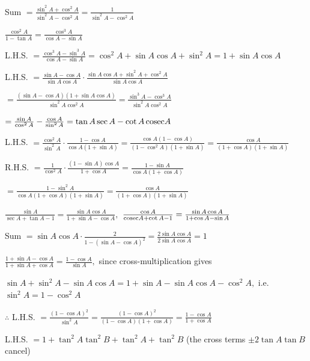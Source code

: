     Sum $= \frac{\sin^2 A + \cos^2 A}{\sin^2 A - \cos^2 A} = \frac{1}{\sin^2 A - \cos^2 A}$

\item $\frac{\cos^2 A}{1 - \tan A} = \frac{\cos^3 A}{\cos A - \sin A}$

    L.H.S. $= \frac{\cos^3 A - \sin^3 A}{\cos A - \sin A} = \cos^2 A + \sin A\cos A + \sin^2 A = 1 + \sin A\cos A$

\item L.H.S. $= \frac{\sin A - \cos A}{\sin A\cos A}\cdot\frac{\sin A\cos A + \sin^2 A + \cos^2 A}{\sin A\cos A}$

    $= \frac{(\sin A - \cos A)(1 + \sin A\cos A)}{\sin^2 A\cos^2 A} = \frac{\sin^3 A - \cos^3 A}{\sin^2 A\cos^2 A}$

    $= \frac{\sin A}{\cos^2 A} - \frac{\cos A}{\sin^2 A} = \tan A\sec A - \cot A\,{\rm cosec} A$

\item L.H.S. $= \frac{\cos^2 A}{\sin^2 A}\cdot\frac{1 - \cos A}{\cos A(1 + \sin A)} = \frac{\cos A(1 - \cos A)}{(1 - \cos^2 A)(1
    + \sin A)} = \frac{\cos A}{(1 + \cos A)(1 + \sin A)}$

    R.H.S. $= \frac{1}{\cos^2 A}\cdot\frac{(1 - \sin A)\cos A}{1 + \cos A} = \frac{1 - \sin A}{\cos A(1 + \cos A)}$

    $= \frac{1 - \sin^2 A}{\cos A(1 + \cos A)(1 + \sin A)} = \frac{\cos A}{(1 + \cos A)(1 + \sin A)}$

\item $\frac{\sin A}{\sec A + \tan A - 1} = \frac{\sin A\cos A}{1 + \sin A - \cos A},$ $\frac{\cos A}{{\rm cosec} A + \cot A - 1} =
    \frac{\sin A\cos A}{1 + \cos A - \sin A}$

    Sum $= \sin A\cos A\cdot\frac{2}{1 - (\sin A - \cos A)^2} = \frac{2\sin A\cos A}{2\sin A\cos A} = 1$

\item $\frac{1 + \sin A - \cos A}{1 + \sin A + \cos A} = \frac{1 - \cos A}{\sin A},$ since cross-multiplication gives

    $\sin A + \sin^2 A - \sin A\cos A = 1 + \sin A - \sin A\cos A - \cos^2 A,$ i.e. $\sin^2 A = 1 - \cos^2 A$

    $\therefore$ L.H.S. $= \frac{(1 - \cos A)^2}{\sin^2 A} = \frac{(1 - \cos A)^2}{(1 - \cos A)(1 + \cos A)} = \frac{1 - \cos A}{1 +
    \cos A}$

\item L.H.S. $= 1 + \tan^2 A\tan^2 B + \tan^2 A + \tan^2 B$ (the cross terms $\pm 2\tan A\tan B$ cancel)

